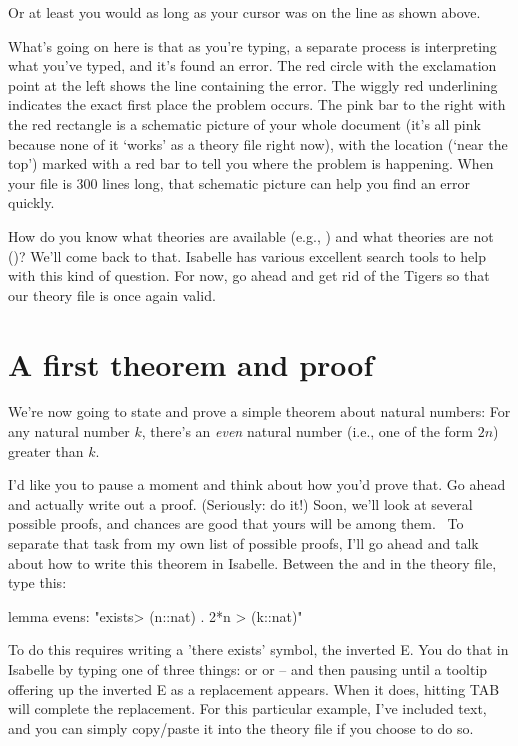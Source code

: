 Or at least you would as long as your cursor was on the  line as shown above. 

What's going on here is that as you're typing, a separate process is interpreting what you've typed, and it's found an error. The red circle with the exclamation point at the left shows the line containing the error. The wiggly red underlining indicates the exact first place the problem occurs. The pink bar to the right with the red rectangle is a schematic picture of your whole document (it's all pink because none of it `works' as a theory file right now), with the location (`near the top') marked with a red bar to tell you where the problem is happening. When your file is 300 lines long, that schematic picture can help you find an error quickly. 

How do you know what theories are available (e.g., ) and what theories are not ()? We'll come back to that. Isabelle has various excellent search tools to help with this kind of question. For now, go ahead and get rid of the Tigers so that our theory file is once again valid. 

\section{A first theorem and proof}
We're now going to state and prove a simple theorem about natural numbers: For any natural number $k$, there's an \textit{even} natural number (i.e., one of the form $2n$) greater than $k$. 

\task I'd like you to pause a moment and think about how you'd prove that. Go ahead and actually write out a proof. (Seriously: do it!) Soon, we'll look at several possible proofs, and chances are good that yours will be among them. 
\etask
To separate that task from my own list of possible proofs, I'll go ahead and talk about how to write this theorem in Isabelle. Between the  and  in the theory file, type this: 
\begin{IS}
lemma evens: "\<exists> (n::nat) . 2*n > (k::nat)"
\end{IS}
To do this requires writing a 'there exists' symbol, the inverted E. You do that in Isabelle by typing one of three things:  or  or \isi{\exists} -- and then pausing until a tooltip offering up the inverted E as a replacement appears. When it does, hitting TAB will complete the replacement. For this particular example, I've included text, and you can simply copy/paste it into the theory file if you choose to do so.

